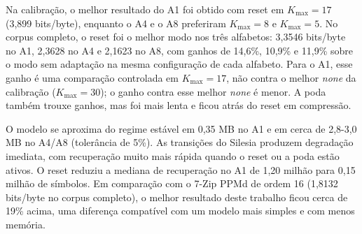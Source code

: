 \documentclass[12pt,a4paper]{article}
\begin{document}
Na calibra\c{c}\~ao, o melhor resultado do A1 foi obtido com reset em
$K_{\max}=17$ (3,899 bits/byte), enquanto o A4 e o A8 preferiram $K_{\max}=8$ e
$K_{\max}=5$. No corpus completo, o reset foi o melhor modo nos tr\^es alfabetos:
3,3546 bits/byte no A1, 2,3628 no A4 e 2,1623 no A8, com ganhos de 14,6\%, 10,9\%
e 11,9\% sobre o modo sem adapta\c{c}\~ao na mesma configura\c{c}\~ao de cada
alfabeto. Para o A1, esse ganho \'e uma compara\c{c}\~ao controlada em
$K_{\max}=17$, n\~ao contra o melhor \emph{none} da calibra\c{c}\~ao
($K_{\max}=30$); o ganho contra esse melhor \emph{none} \'e menor. A poda tamb\'em
trouxe ganhos, mas foi mais lenta e ficou atr\'as do reset em compress\~ao.

O modelo se aproxima do regime est\'avel em
0,35 MB no A1 e em cerca de 2,8-3,0 MB no A4/A8 (toler\^ancia de 5\%). As
transi\c{c}\~oes do Silesia produzem degrada\c{c}\~ao imediata, com
recupera\c{c}\~ao muito mais r\'apida quando o reset ou a poda est\~ao ativos. O
reset reduziu a mediana de recupera\c{c}\~ao no A1 de 1,20 milh\~ao para 0,15
milh\~ao de s\'imbolos. Em compara\c{c}\~ao com o 7-Zip PPMd de ordem 16 (1,8132
bits/byte no corpus completo), o melhor resultado deste trabalho ficou cerca de
19\% acima, uma diferen\c{c}a compat\'ivel com um modelo mais simples e com menos
mem\'oria.
\end{document}
